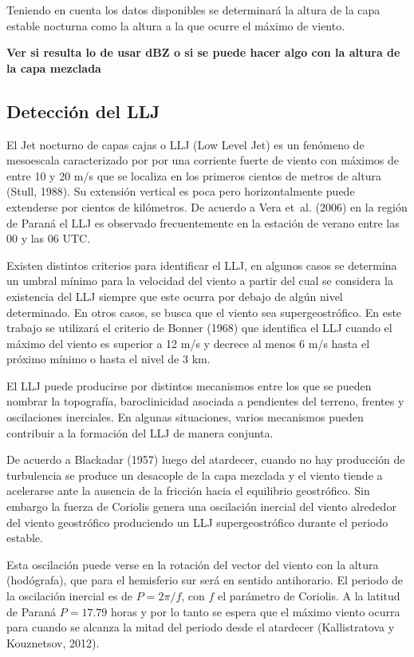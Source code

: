 \documentclass[12pt,spanish,oneside]{book}
\begin{document}
Teniendo en cuenta los datos disponibles se determinará la altura de la
capa estable nocturna como la altura a la que ocurre el máximo de
viento.

\textbf{Ver si resulta lo de usar dBZ o si se puede hacer algo con la
altura de la capa mezclada}

\subsection{Detección del LLJ}\label{deteccion-del-llj}

El Jet nocturno de capas cajas o LLJ (Low Level Jet) es un fenómeno de
mesoescala caracterizado por por una corriente fuerte de viento con
máximos de entre 10 y 20 m/s que se localiza en los primeros cientos de
metros de altura (Stull, 1988). Su extensión vertical es poca pero
horizontalmente puede extenderse por cientos de kilómetros. De acuerdo a
Vera et~al. (2006) en la región de Paraná el LLJ es observado
frecuentemente en la estación de verano entre las 00 y las 06 UTC.

Existen distintos criterios para identificar el LLJ, en algunos casos se
determina un umbral mínimo para la velocidad del viento a partir del
cual se considera la existencia del LLJ siempre que este ocurra por
debajo de algún nivel determinado. En otros casos, se busca que el
viento sea supergeostrófico. En este trabajo se utilizará el criterio de
Bonner (1968) que identifica el LLJ cuando el máximo del viento es
superior a 12 m/s y decrece al menos 6 m/s hasta el próximo mínimo o
hasta el nivel de 3 km.

El LLJ puede producirse por distintos mecanismos entre los que se pueden
nombrar la topografía, baroclinicidad asociada a pendientes del terreno,
frentes y oscilaciones inerciales. En algunas situaciones, varios
mecanismos pueden contribuir a la formación del LLJ de manera conjunta.

De acuerdo a Blackadar (1957) luego del atardecer, cuando no hay
producción de turbulencia se produce un desacople de la capa mezclada y
el viento tiende a acelerarse ante la ausencia de la fricción hacia el
equilibrio geostrófico. Sin embargo la fuerza de Coriolis genera una
oscilación inercial del viento alrededor del viento geostrófico
produciendo un LLJ supergeostrófico durante el periodo estable.

Esta oscilación puede verse en la rotación del vector del viento con la
altura (hodógrafa), que para el hemisferio sur será en sentido
antihorario. El periodo de la oscilación inercial es de \(P = 2\pi/f\),
con \(f\) el parámetro de Coriolis. A la latitud de Paraná \(P = 17.79\)
horas y por lo tanto se espera que el máximo viento ocurra para cuando
se alcanza la mitad del periodo desde el atardecer (Kallistratova y
Kouznetsov, 2012).
\end{document}
